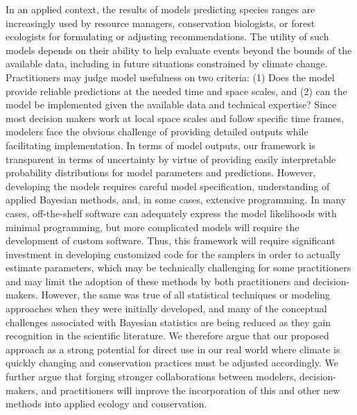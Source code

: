 \documentclass[11pt]{article}
\begin{document}
In an applied context, the results of models predicting species ranges are increasingly used by resource managers, conservation biologists, or forest ecologists for formulating or adjusting recommendations. 
The utility of such models depends on their ability to help evaluate events beyond the bounds of the available data, including in future situations constrained by climate change. 
Practitioners may judge model usefulness on two criteria: (1) Does the model provide reliable predictions at the needed time and space scales, and (2) can the model be implemented given the available data and technical expertise? 
Since most decision makers work at local space scales and follow specific time frames, modelers face the obvious challenge of providing detailed outputs while facilitating implementation.
In terms of model outputs, our framework is transparent in terms of uncertainty by virtue of providing easily interpretable probability distributions for model parameters and predictions.
However, developing the models requires careful model specification, understanding of applied Bayesian methods, and, in some cases, extensive programming.
In many cases, off-the-shelf software can adequately express the model likelihoods with minimal programming, but more complicated models will require the development of custom software.
Thus, this framework will require significant investment in developing customized code for the samplers in order to actually estimate parameters, which may be technically challenging for some practitioners and may limit the adoption of these methods by both practitioners and decision-makers.
However, the same was true of all statistical techniques or modeling approaches when they were initially developed, and many of the conceptual challenges associated with Bayesian statistics are being reduced as they gain recognition in the scientific literature. 
We therefore argue that our proposed approach as a strong potential for direct use in our real world where climate is quickly changing and conservation practices must be adjusted accordingly.
We further argue that forging stronger collaborations between modelers, decision-makers, and practitioners will improve the incorporation of this and other new methods into applied ecology and conservation.


\end{document}
